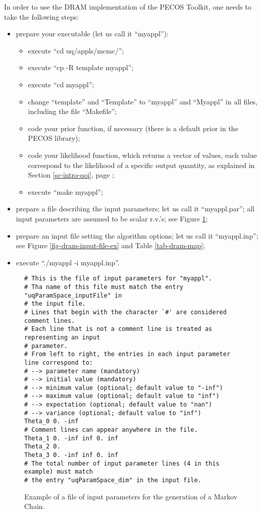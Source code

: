 In order to use the DRAM implementation of the PECOS Toolkit, one needs to take the following steps:
\begin{itemize}
\item {prepare your executable (let us call it ``myappl''):
\begin{itemize}
\item execute ``cd uq/appls/mcmc/'';
\item execute ``cp -R template myappl'';
\item execute ``cd myappl'';
\item change ``template'' and ``Template'' to ``myappl'' and ``Myappl'' in all files, including the file ``Makefile'';
\item code your prior function, if necessary (there is a default prior in the PECOS library);
\item code your likelihood function, which returns a vector of values, each value correspond to the likelihood of a specific output quantity, as explained in Section \ref{sc-intro-qoi}, page \pageref{sc-intro-qoi};
\item execute ``make myappl'';
\end{itemize}
}
\item prepare a file describing the input parameters; let us call it ``myappl.par''; all input parameters are assumed to be scalar r.v.'s; see Figure \ref{fig-dram-par-file-ex}; 
\item prepare an input file setting the algorithm options; let us call it ``myappl.inp''; see Figure \ref{fig-dram-input-file-ex} and Table \ref{tab-dram-map};
\item execute ``./myappl -i myappl.inp''.
\end{itemize}

\begin{figure}[h]
\begin{verbatim}
# This is the file of input parameters for "myappl".
# Tha name of this file must match the entry "uqParamSpace_inputFile" in
# the input file.
# Lines that begin with the character `#' are considered comment lines.
# Each line that is not a comment line is treated as representing an input
# parameter.
# From left to right, the entries in each input parameter line correspond to:
# --> parameter name (mandatory)
# --> initial value (mandatory)
# --> minimum value (optional; default value to "-inf")
# --> maximum value (optional; default value to "inf")
# --> expectation (optional; default value to "nan")
# --> variance (optional; default value to "inf")
Theta_0 0. -inf
# Comment lines can appear anywhere in the file.
Theta_1 0. -inf inf 0. inf
Theta_2 0.
Theta_3 0. -inf inf 0. inf
# The total number of input parameter lines (4 in this example) must match
# the entry "uqParamSpace_dim" in the input file.
\end{verbatim}
\caption{Example of a file of input parameters for the generation of a Markov Chain.
}
\label{fig-dram-par-file-ex}
\end{figure}

